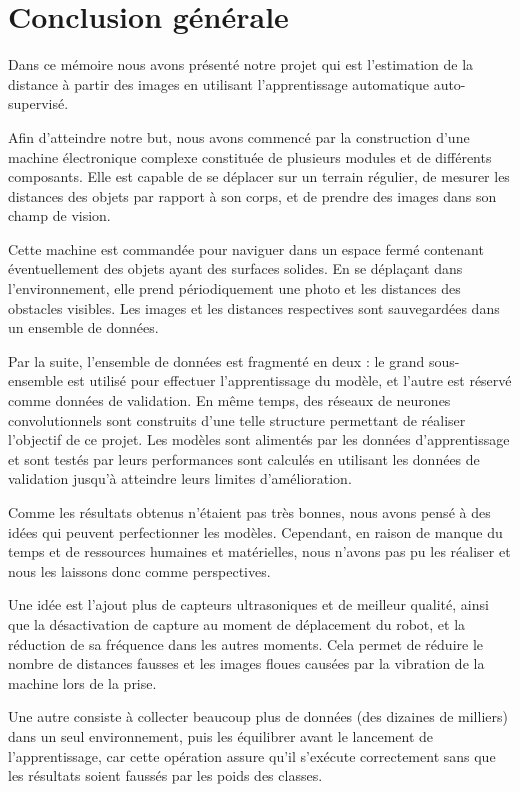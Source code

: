 \chapter*{Conclusion générale}

Dans ce mémoire nous avons présenté notre projet qui est l'estimation de la distance
à partir des images en utilisant l'apprentissage automatique auto-supervisé.

Afin d'atteindre notre but, nous avons commencé par la construction d'une machine
électronique complexe constituée de plusieurs modules et de différents composants.
Elle est capable de se déplacer sur un terrain régulier, de mesurer
les distances des objets par rapport à son corps, et de prendre des images dans son
champ de vision.

Cette machine est commandée pour naviguer dans un espace fermé contenant éventuellement
des objets ayant des surfaces solides. En se déplaçant dans l'environnement, elle
prend périodiquement une photo et les distances des obstacles visibles. Les images
et les distances respectives sont sauvegardées dans un ensemble de données.

Par la suite, l'ensemble de données est fragmenté en deux : le grand sous-ensemble
est utilisé pour effectuer l'apprentissage du modèle, et l'autre est réservé
comme données de validation. En même temps, des réseaux de neurones convolutionnels
sont construits d'une telle structure permettant de réaliser l'objectif de ce projet.
Les modèles sont alimentés par les données d'apprentissage et sont testés par leurs
performances sont calculés en utilisant les données de validation jusqu'à atteindre
leurs limites d'amélioration.

Comme les résultats obtenus n'étaient pas très bonnes, nous avons pensé à des
idées qui peuvent perfectionner les modèles. Cependant, en raison de manque du temps et
de ressources humaines et matérielles, nous n'avons pas pu les réaliser et nous
les laissons donc comme perspectives.

Une idée est l'ajout plus de capteurs ultrasoniques et de meilleur qualité, ainsi
que la désactivation de capture au moment de déplacement du robot, et la réduction de
sa fréquence dans les autres moments. Cela permet de réduire le nombre de
distances fausses et les images floues causées par la vibration de la machine lors de la prise.

Une autre consiste à collecter beaucoup plus de données (des dizaines de milliers)
dans un seul environnement, puis les équilibrer avant le lancement de l'apprentissage,
car cette opération assure qu'il s'exécute correctement sans que les résultats soient
faussés par les poids des classes.

